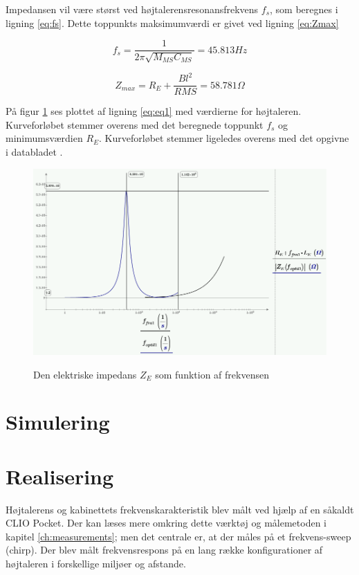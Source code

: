 Impedansen vil være størst ved højtalerensresonansfrekvens $f_s$, som beregnes i ligning \ref{eq:fs}. Dette toppunkts maksimumværdi er givet ved ligning \ref{eq:Zmax} 

\begin{equation}\label{eq:fs}
f_s=\frac{1}{2 \pi \sqrt{M_{MS} C_{MS}}}=45.813Hz
\end{equation}

\begin{equation}\label{eq:Zmax}
Z_{max}=R_E+\frac{Bl^2}{R{MS}}=58.781\Omega
\end{equation}

På figur \ref{fig:ZE_graf}  ses plottet af ligning \ref{eq:eq1} med værdierne for højtaleren. Kurveforløbet stemmer overens med det beregnede toppunkt $f_s$ og minimumsværdien $R_E$. Kurveforløbet stemmer ligeledes overens med det opgivne i databladet \citep{FW168}.

\begin{figure}[H]
	\centering
	\includegraphics[width=\textwidth]{Pics/ZE_graf.PNG}
	\label{fig:ZE_graf}
	\caption{Den elektriske impedans $Z_E$ som funktion af frekvensen} 
\end{figure}

\section{Simulering}

\newpage
\section{Realisering}
Højtalerens og kabinettets frekvenskarakteristik blev målt ved hjælp af en såkaldt CLIO Pocket. Der kan læses mere omkring dette værktøj og målemetoden i kapitel \ref{ch:measurements}; men det centrale er, at der måles på et frekvens-sweep (chirp). Der blev målt frekvensrespons på en lang række konfigurationer af højtaleren i forskellige miljøer og afstande.


